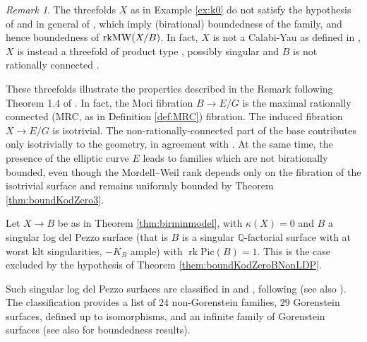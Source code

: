 \documentclass[11pt]{amsart}
\theoremstyle{definition}
\theoremstyle{definition}
\theoremstyle{remark}
\newtheorem{remark}[theorem]{Remark}
\theoremstyle{remark}
\theoremstyle{definition}
\theoremstyle{conjecture}
\newcommand{\MW}{\mathrm{MW}}
\newcommand{\Pic}{\mathrm{Pic}}
\begin{document}
 
\begin{remark}\label{remark:producttype}   The threefolds  $X$ as in Example \ref{ex:k0} do not satisfy the hypothesis of \cite{DiCerboSvaldi, Filipazzi:2021dcw} and in general of \cite{Birkar_2024},  which  imply (birational) boundedness of  the family, and hence boundedness of ${\rm rk}{\MW}(X/B)$.
 In fact, $X$ is not a Calabi-Yau as defined in \cite{Filipazzi:2021dcw},  $X$ is  instead a threefold of product type \cite{DiCerboSvaldi}, possibly singular and  $B$ is not rationally connected \cite{Birkar_2024}.
 

 These threefolds illustrate the properties described in the  Remark following Theorem 1.4 of \cite{Birkar_2024}. In fact, the Mori fibration  
$B \to E/G$ is the maximal rationally connected (MRC, as in Definition \ref{def:MRC}) fibration. The induced fibration 
$X \to E/G$ is isotrivial.
The non-rationally-connected part of the base contributes only isotrivially to the geometry, in agreement with \cite{Birkar_2024}. 
At the same time, the presence of the elliptic  curve $E$ leads to families which are not birationally bounded, even though the Mordell–Weil rank depends only on the fibration of the isotrivial surface and remains uniformly bounded by Theorem \ref{thm:boundKodZero3}.
\end{remark}


\medskip

  Let $X \to B$  be as in Theorem \ref{thm:birminmodel}, with $\kappa(X)=0$ and  %
 $B$  a  singular log del Pezzo surface (that is  $B$ is a  singular $\mathbb{Q}$-factorial surface with at worst klt singularities,  $-K_B$ ample)  with $\operatorname{rk}{\Pic}(B)=1$. This is  the case excluded  by the hypothesis of  Theorem \ref{them:boundKodZeroBNonLDP}.

 
 Such singular  log del Pezzo surfaces %
 are classified in \cite{YeGorLogDelPezzo}  and \cite{Lacini2024}, following \cite{KeelMcKernan1999} (see also \cite{Nagaoka2025reviewlacinisclassificationrank}).
 The classification provides a list of  $24$ non-Gorenstein families,  %
 $29$ Gorenstein surfaces, defined  up to isomorphisms, and an infinite family of  Gorenstein surfaces %
 \cite{YeGorLogDelPezzo} (see also \cite{Alexeev1994} for boundedness results).
\end{document}
